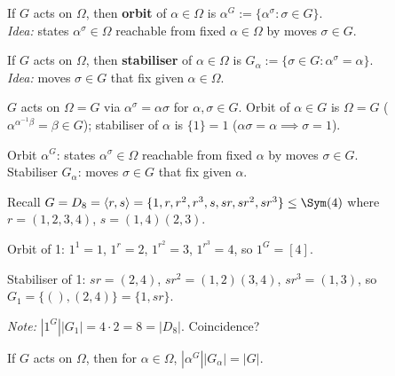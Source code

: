 \begin{slide}
    \begin{definition}[orbit]
        \vspace{0pt}
        If $G$ acts on $\Omega$, then \textbf{orbit} of $\alpha \in \Omega$ is $\alpha^G := \{\alpha^\sigma : \sigma \in G\}$. \\
        \textit{Idea:} states $\alpha^\sigma \in \Omega$ reachable from fixed $\alpha \in \Omega$ by moves $\sigma \in G$. \pause
    \end{definition}

    \begin{definition}[stabiliser]
        \vspace{0pt}
        If $G$ acts on $\Omega$, then \textbf{stabiliser} of $\alpha \in \Omega$ is $G_\alpha := \{\sigma \in G : \alpha^\sigma = \alpha\}$. \\
        \textit{Idea:} moves $\sigma \in G$ that fix given $\alpha \in \Omega$. \pause
    \end{definition}

    \begin{example}
        \vspace{0pt}
        $G$ acts on $\Omega = G$ via $\alpha^\sigma = \alpha \sigma$ for $\alpha,\sigma \in G$. Orbit of $\alpha \in G$ is \pause $\Omega = G$ ($\alpha^{\alpha^{-1}\beta} = \beta \in G$); stabiliser of $\alpha$ is \pause $\{1\} = 1$ ($\alpha\sigma = \alpha \implies \sigma = 1$).
    \end{example}
\end{slide}

\begin{slide}
    Orbit $\alpha^G$: states $\alpha^\sigma \in \Omega$ reachable from fixed $\alpha$ by moves $\sigma \in G$. \\
    Stabiliser $G_\alpha$: moves $\sigma \in G$ that fix given $\alpha$.

    \begin{example}
        \vspace{0pt}
        Recall $G = D_8 = \langle r,s \rangle = \{1,r,r^2,r^3,s,sr,sr^2,sr^3\} \leq \Sym(4)$ where $r = (1,2,3,4)$, $s = (1,4)(2,3)$.

        Orbit of 1: $1^1 = 1$, $1^r = 2$, $1^{r^2} = 3$, $1^{r^3} = 4$, so $1^G = [4]$.

        Stabiliser of 1: $sr = (2,4)$, $sr^2 = (1,2)(3,4)$, $sr^3 = (1,3)$, so $G_1 = \{(),(2,4)\} = \{1,sr\}$.

        \textit{Note:} $|1^G||G_1| = 4 \cdot 2 = 8 = |D_8|$. Coincidence?
    \end{example}

    \begin{theorem}
        \vspace{0pt}
        If $G$ acts on $\Omega$, then for $\alpha \in \Omega$, $|\alpha^G||G_\alpha| = |G|$.
    \end{theorem}
\end{slide}